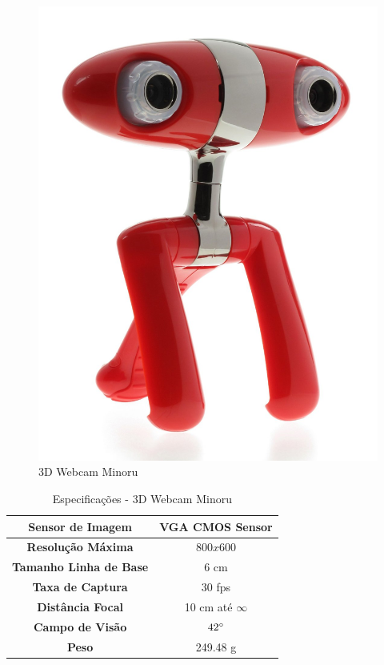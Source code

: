 \begin{figure}[H]
	\centering
	\includegraphics[scale=0.10]{./Resources/minoru.jpg}
	\caption{3D Webcam Minoru}
	\label{minoru}
\end{figure}

\begin{table}[]
\centering
\caption{Especificações - 3D Webcam Minoru}
\label{minoru_tab}
\begin{tabular}{|c|c|}
\hline
\textbf{Sensor de Imagem}      & VGA CMOS Sensor  	\\	\hline
\textbf{Resolução Máxima}      & $800x600$        	\\	\hline
\textbf{Tamanho Linha de Base} & 6 cm             	\\	\hline
\textbf{Taxa de Captura}       & 30 fps             	\\	\hline
\textbf{Distância Focal}       & 10 cm até $\infty$	\\	\hline
\textbf{Campo de Visão}        & $42\degree$		\\	\hline
\textbf{Peso}		       & 249.48 g		\\	\hline
\end{tabular}
\end{table}

